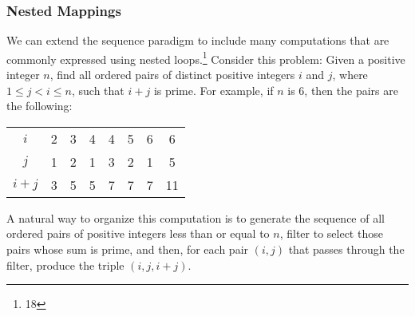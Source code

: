 \begin{Exercise}
\subsubsection*{Nested Mappings}

We can extend the sequence paradigm to include many computations that
are commonly expressed using nested loops.\footnote{18} Consider this
problem: Given a positive integer $n$, find all ordered pairs of
distinct positive integers $i$ and $j$, where $ 1 \le j < i \le n$,
such that $i + j$ is prime.  For example, if $n$ is 6, then the pairs
are the following: 

\begin{tabular}{c|ccccccc}
  $i$ & 2 & 3 & 4 & 4 & 5 & 6 & 6 \\
  $j$ & 1 & 2 & 1 & 3 & 2 & 1 & 5 \\
  \hline{}
  $ i + j$ & 3 & 5 & 5 & 7 & 7 & 7 & 11
\end{tabular}

A natural way to organize this computation is to generate the sequence
of all ordered pairs of positive integers less than or equal to $n$,
filter to select those pairs whose sum is prime, and then, for each
pair $(i,j)$ that passes through the filter, produce the triple
$(i,j,i+j)$.


\end{Exercise}
